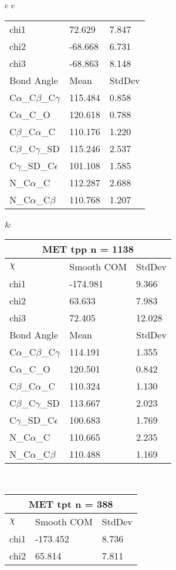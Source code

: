 \begin{longtable}{ c c }
\begin{tabular}{ l l l }
  chi1 & 72.629 & 7.847 \\ 
  chi2 & -68.668 & 6.731 \\ 
  chi3 & -68.863 & 8.148 \\ \midrule
  Bond Angle   & Mean     & StdDev \\ \midrule
  C$\alpha$\_C$\beta$\_C$\gamma$ & 115.484 & 0.858\\
  C$\alpha$\_C\_O & 120.618 & 0.788\\
  C$\beta$\_C$\alpha$\_C & 110.176 & 1.220\\
  C$\beta$\_C$\gamma$\_SD & 115.246 & 2.537\\
  C$\gamma$\_SD\_C$\epsilon$ & 101.108 & 1.585\\
  N\_C$\alpha$\_C & 112.287 & 2.688\\
  N\_C$\alpha$\_C$\beta$ & 110.768 & 1.207\\
  \bottomrule
  \end{tabular}
  &
  \begin{tabular}{ l l l }
  \toprule
  \multicolumn{3}{c}{MET \textbf{tpp} n = 1138} \\ \toprule
  $\chi$       & Smooth COM & StdDev \\ \midrule
  chi1 & -174.981 & 9.366 \\ 
  chi2 & 63.633 & 7.983 \\ 
  chi3 & 72.405 & 12.028 \\ \midrule
  Bond Angle   & Mean     & StdDev \\ \midrule
  C$\alpha$\_C$\beta$\_C$\gamma$ & 114.191 & 1.355\\
  C$\alpha$\_C\_O & 120.501 & 0.842\\
  C$\beta$\_C$\alpha$\_C & 110.324 & 1.130\\
  C$\beta$\_C$\gamma$\_SD & 113.667 & 2.023\\
  C$\gamma$\_SD\_C$\epsilon$ & 100.683 & 1.769\\
  N\_C$\alpha$\_C & 110.665 & 2.235\\
  N\_C$\alpha$\_C$\beta$ & 110.488 & 1.169\\
  \bottomrule
  \end{tabular}
  \\
  \begin{tabular}{ l l l }
  \toprule
  \multicolumn{3}{c}{MET \textbf{tpt} n = 388} \\ \toprule
  $\chi$       & Smooth COM & StdDev \\ \midrule
  chi1 & -173.452 & 8.736 \\ 
  chi2 & 65.814 & 7.811 \\ 

\end{tabular}
\end{longtable}
